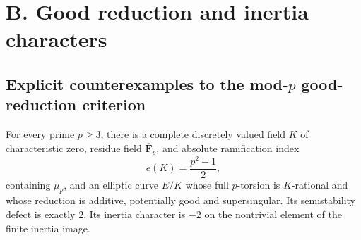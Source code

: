 \section{B. Good reduction and inertia characters}
\subsection{Explicit counterexamples to the mod-$p$ good-reduction criterion}

\begin{theorem}\label{thm:B-RD1}
For every prime $p\geq3$, there is a complete discretely valued field $K$
of characteristic zero, residue field $\overline{\mathbf F}_p$, and
absolute ramification index
\[
 e(K)=\frac{p^2-1}{2},
\]
containing $\mu_p$, and an elliptic curve $E/K$ whose full $p$-torsion
is $K$-rational and whose reduction is additive, potentially good and
supersingular. Its semistability defect is exactly $2$. Its inertia
character is $-2$ on the nontrivial element of the finite inertia image.
\end{theorem}
